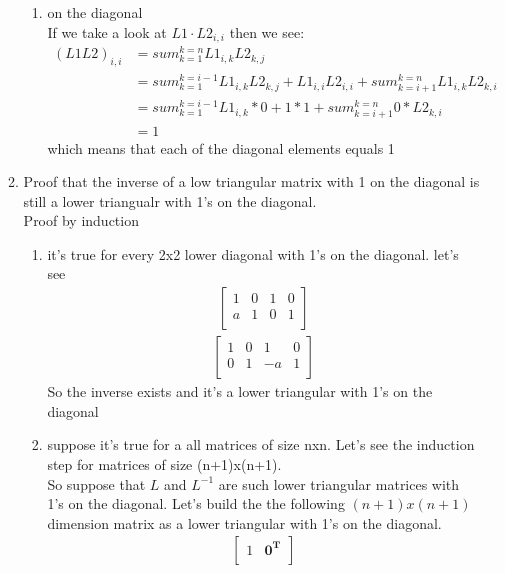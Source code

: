\documentclass[a4paper,11pt]{article}
\newcommand{\mybf}[1]{\boldsymbol{#1}}
\begin{document}
\begin{enumerate}
\begin{enumerate}
\begin{enumerate}
\item on the diagonal\\
If we take a look at $L1 \cdot L2_{i,i}$ then we see:
\begin{align}
(L1L2)_{i,i} &= sum_{k=1}^{k=n} L1_{i,k}L2_{k,j}  \\
&= sum_{k=1}^{k=i-1} L1_{i,k}L2_{k,j} + L1_{i,i}L2_{i,i} + sum_{k=i+1}^{k=n} L1_{i,k}L2_{k,i} \\
&= sum_{k=1}^{k=i-1} L1_{i,k}*0 + 1*1 + sum_{k=i+1}^{k=n} 0*L2_{k,i} \\
&= 1
\end{align}
which means that each of the diagonal elements equals 1
\end{enumerate}
\item Proof that the inverse of a low triangular matrix with 1 on the diagonal is still a lower triangualr with 1's on the diagonal.\\
Proof by induction
\begin{enumerate}
\item it's true for every 2x2 lower diagonal with 1's on the diagonal. let's see
\begin{align}
\left[
\begin{array}{cc|cc}
1 & 0 & 1 & 0 \\
a & 1 & 0 & 1 \\
\end{array}
\right]
\end{align}
\begin{align}
\left[
\begin{array}{cc|cc}
1 & 0 & 1 & 0 \\
0 & 1 & -a & 1 \\
\end{array}
\right]
\end{align}
So the inverse exists and it's a lower triangular with 1's on the diagonal
\item suppose it's true for a all matrices of size nxn. Let's see the induction step for matrices of size (n+1)x(n+1).  \\
So suppose that $L$ and $L^{-1}$ are such lower triangular matrices with 1's on the diagonal. Let's build the the following $(n+1)x(n+1)$ dimension matrix as a lower triangular with 1's on the diagonal.
\begin{align}
\begin{bmatrix}
1        & \mybf{0^T}\\

\end{bmatrix}
\end{align}
\end{enumerate}
\end{enumerate}
\end{enumerate}
\end{document}
